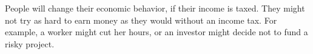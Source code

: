 People will change their economic behavior, if their income is taxed.
They might not try as hard to earn money as they would without an income tax.
For example, a worker might cut her hours, or an investor might decide not to fund a risky project.